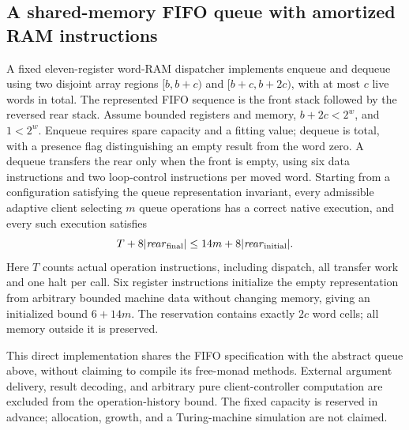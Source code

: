 \begin{result}
\subsection{A shared-memory FIFO queue with amortized RAM instructions}
A fixed eleven-register word-RAM dispatcher implements enqueue and dequeue using two disjoint
array regions $[b,b+c)$ and $[b+c,b+2c)$, with at most $c$ live words in total. The represented
FIFO sequence is the front stack followed by the reversed rear stack. Assume bounded registers
and memory, $b+2c<2^w$, and $1<2^w$. Enqueue requires spare capacity and a fitting value;
dequeue is total, with a presence flag distinguishing an empty result from the word zero.
A dequeue transfers the rear only when the front is empty, using six data instructions and two
loop-control instructions per moved word. Starting from a configuration satisfying the queue
representation invariant, every admissible adaptive client selecting $m$ queue operations has
a correct native execution, and every such execution satisfies
\[
  T + 8|\mathit{rear}_{\rm final}|
  \le 14m + 8|\mathit{rear}_{\rm initial}|.
\]
Here $T$ counts actual operation instructions, including dispatch, all transfer work and one
halt per call. Six register instructions initialize the empty representation from arbitrary
bounded machine data without changing memory, giving an initialized bound $6+14m$.
The reservation contains exactly $2c$ word cells; all memory outside it is preserved.

This direct implementation shares the FIFO specification with the abstract queue above,
without claiming to compile its free-monad methods. External argument delivery, result decoding,
and arbitrary pure client-controller computation are excluded from the operation-history bound.
The fixed capacity is reserved in advance; allocation, growth, and a Turing-machine simulation
are not claimed.\citep[Exercise 10.1-6 and Chapter 17]{CLRS2009}
\end{result}


